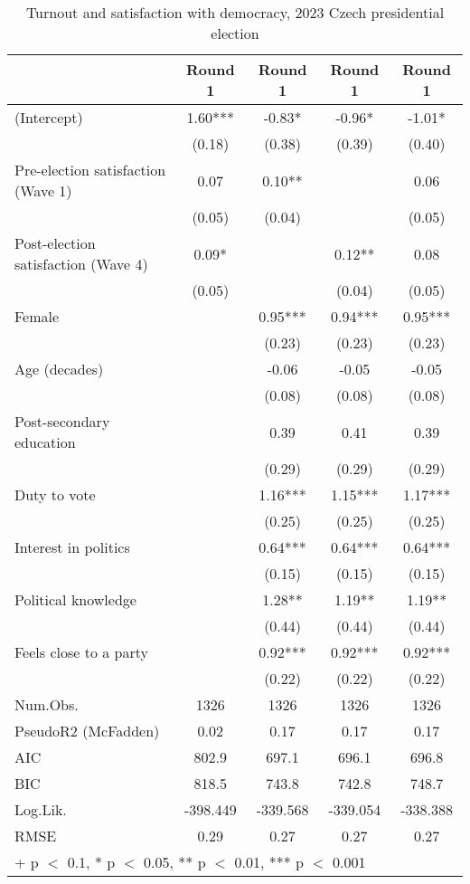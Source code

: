 \begin{table}

\caption{Turnout and satisfaction with democracy, 2023 Czech presidential election}
\centering
\begin{tabular}[t]{lcccc}
\toprule
  & Round 1 & Round 1  & Round 1   & Round 1   \\
\midrule
(Intercept) & 1.60*** & -0.83* & -0.96* & -1.01*\\
 & (0.18) & (0.38) & (0.39) & (0.40)\\
Pre-election satisfaction (Wave 1) & 0.07 & 0.10** &  & 0.06\\
 & (0.05) & (0.04) &  & (0.05)\\
Post-election satisfaction (Wave 4) & 0.09* &  & 0.12** & 0.08\\
 & (0.05) &  & (0.04) & (0.05)\\
Female &  & 0.95*** & 0.94*** & 0.95***\\
 &  & (0.23) & (0.23) & (0.23)\\
Age (decades) &  & -0.06 & -0.05 & -0.05\\
 &  & (0.08) & (0.08) & (0.08)\\
Post-secondary education &  & 0.39 & 0.41 & 0.39\\
 &  & (0.29) & (0.29) & (0.29)\\
Duty to vote &  & 1.16*** & 1.15*** & 1.17***\\
 &  & (0.25) & (0.25) & (0.25)\\
Interest in politics &  & 0.64*** & 0.64*** & 0.64***\\
 &  & (0.15) & (0.15) & (0.15)\\
Political knowledge &  & 1.28** & 1.19** & 1.19**\\
 &  & (0.44) & (0.44) & (0.44)\\
Feels close to a party &  & 0.92*** & 0.92*** & 0.92***\\
 &  & (0.22) & (0.22) & (0.22)\\
\midrule
Num.Obs. & 1326 & 1326 & 1326 & 1326\\
PseudoR2 (McFadden) & 0.02 & 0.17 & 0.17 & 0.17\\
AIC & 802.9 & 697.1 & 696.1 & 696.8\\
BIC & 818.5 & 743.8 & 742.8 & 748.7\\
Log.Lik. & -398.449 & -339.568 & -339.054 & -338.388\\
RMSE & 0.29 & 0.27 & 0.27 & 0.27\\
\bottomrule
\multicolumn{5}{l}{\rule{0pt}{1em}+ p $<$ 0.1, * p $<$ 0.05, ** p $<$ 0.01, *** p $<$ 0.001}\\
\end{tabular}
\end{table}
